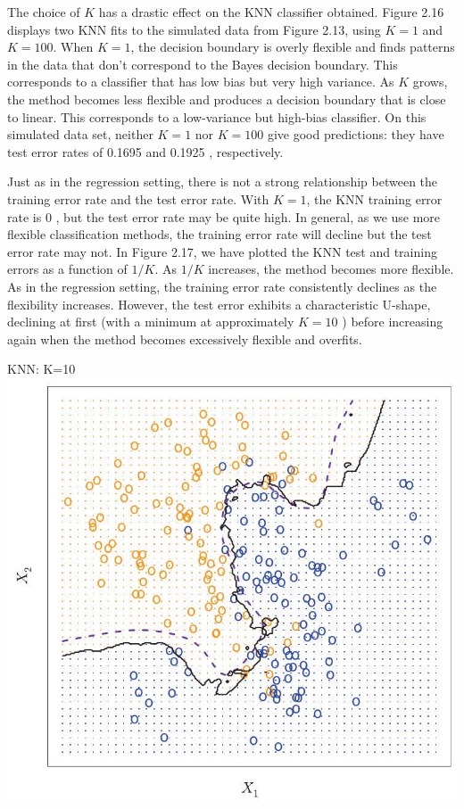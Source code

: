 \documentclass[10pt]{article}
\begin{document}
The choice of $K$ has a drastic effect on the KNN classifier obtained. Figure 2.16 displays two KNN fits to the simulated data from Figure 2.13, using $K=1$ and $K=100$. When $K=1$, the decision boundary is overly flexible and finds patterns in the data that don't correspond to the Bayes decision boundary. This corresponds to a classifier that has low bias but very high variance. As $K$ grows, the method becomes less flexible and produces a decision boundary that is close to linear. This corresponds to a low-variance but high-bias classifier. On this simulated data set, neither $K=1$ nor $K=100$ give good predictions: they have test error rates of 0.1695 and 0.1925 , respectively.

Just as in the regression setting, there is not a strong relationship between the training error rate and the test error rate. With $K=1$, the KNN training error rate is 0 , but the test error rate may be quite high. In general, as we use more flexible classification methods, the training error rate will decline but the test error rate may not. In Figure 2.17, we have plotted the KNN test and training errors as a function of $1 / K$. As $1 / K$ increases, the method becomes more flexible. As in the regression setting, the training error rate consistently declines as the flexibility increases. However, the test error exhibits a characteristic U-shape, declining at first (with a minimum at approximately $K=10$ ) before increasing again when the method becomes excessively flexible and overfits.

KNN: K=10\\
\includegraphics[max width=\textwidth, center]{2025_05_05_efe77898333945044de4g-056}
\end{document}
